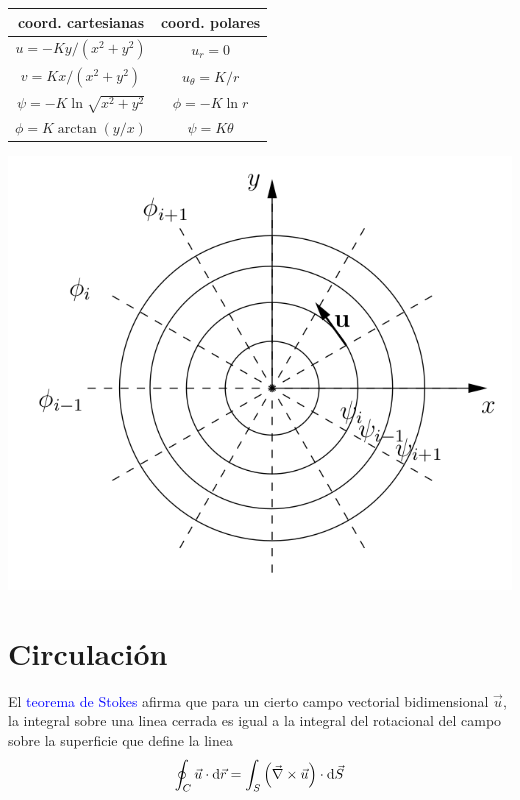 \begin{itemize}
	\begin{minipage}[c]{0.6\textwidth}%
		\begin{tabular}{|c|c|}
			\hline 
			coord. cartesianas  & coord. polares \tabularnewline
			\hline 
			$u=-K{y}/{(x^{2}+y^{2})}$  & $u_{r}=0$ \tabularnewline
			$v=K{x}/{(x^{2}+y^{2})}$  & $u_{\theta}=K/r$ \tabularnewline
			$\psi=-K\ln\sqrt{x^{2}+y^{2}}$  & $\phi=-K\ln r$ \tabularnewline
			$\phi=K\arctan({y}/{x})$  & $\psi=K\theta$ \tabularnewline
			\hline 
		\end{tabular}%
	\end{minipage}%
	\begin{minipage}[c]{0.4\textwidth}%
\begin{center}
	\includegraphics[width=\linewidth]{TeX_files/chapter09-Externo/vortice}
\end{center}
	\end{minipage}
\end{itemize}

\section{Circulación}

	
	El \textcolor{blue}{teorema de Stokes} afirma que para un cierto campo
	vectorial bidimensional $\vec{u}$, la integral sobre una linea cerrada
	es igual a la integral del rotacional del campo sobre la superficie
	que define la linea 
	\[
	\oint_{C}\vec{u}\cdot\text{d}\vec{r}=\int_{S}\left(\vec \nabla \times\vec{u}\right)\cdot\text{d}\vec{S}
	\]
	
